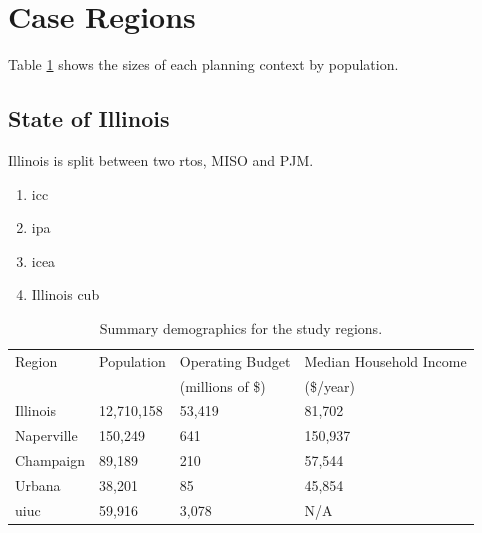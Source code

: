 \section{Case Regions}
\label{section:cases}

Table \ref{tab:demographics} shows the sizes of each planning context by
population.



\subsection{State of Illinois}
Illinois is split between two \acp{rto}, MISO and PJM.

\begin{enumerate}
    \item \ac{icc}
    \item \ac{ipa}
    \item \ac{icea}
    \item Illinois \ac{cub}
\end{enumerate}



\begin{table}
    \centering
    \caption{Summary demographics for the study regions.}
    \label{tab:demographics}
    \begin{tabular}{llll}
        \toprule
        Region & Population & Operating Budget & Median Household Income \\
        & & (millions of \$) &(\$/year) \\
        \midrule
        Illinois
        \cite{united_states_census_bureau_quickfacts_2024-3,sturm_illinois_2024}&
        12,710,158  & 53,419 & 81,702\\
        Naperville
        \cite{united_states_census_bureau_quickfacts_2024-2,munch_annual_2024} &
        150,249  & 641 & 150,937 \\
        Champaign
        \cite{united_states_census_bureau_quickfacts_2024,nees_adopted_2024} &
        89,189 & 210 & 57,544 \\
        Urbana \cite{united_states_census_bureau_quickfacts_2024-1,
        ho_city_2024}& 38,201 & 85 & 45,854 \\
        \ac{uiuc} \cite{data_usa_university_2022,
        university_of_illinois_system_fy_2024} & 59,916 & 3,078 & N/A \\
        \bottomrule
    \end{tabular}
\end{table}

